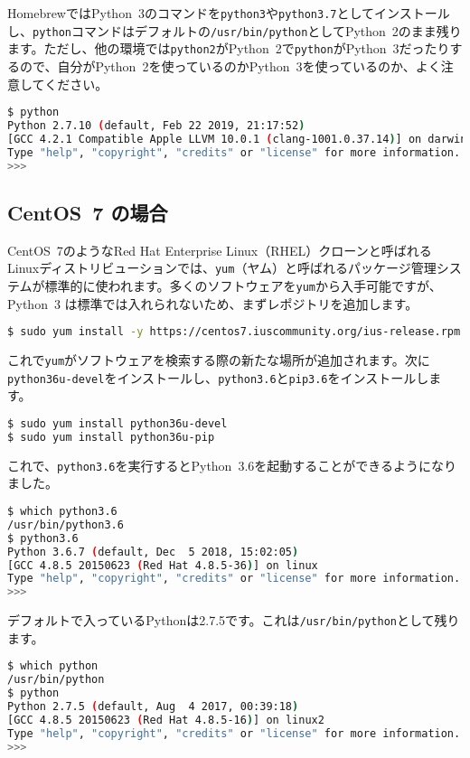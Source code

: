 HomebrewではPython~3のコマンドを\texttt{python3}や\texttt{python3.7}としてインストールし、\texttt{python}コマンドはデフォルトの\texttt{/usr/bin/python}としてPython~2のまま残ります。ただし、他の環境では\texttt{python2}がPython~2で\texttt{python}がPython~3だったりするので、自分がPython~2を使っているのかPython~3を使っているのか、よく注意してください。

\begin{lstlisting}[language=bash]
$ python
Python 2.7.10 (default, Feb 22 2019, 21:17:52) 
[GCC 4.2.1 Compatible Apple LLVM 10.0.1 (clang-1001.0.37.14)] on darwin
Type "help", "copyright", "credits" or "license" for more information.
>>> 
\end{lstlisting}

\subsection{CentOS~7 の場合}

CentOS~7のようなRed Hat Enterprise Linux（RHEL）クローンと呼ばれるLinuxディストリビューションでは、\texttt{yum}（ヤム）と呼ばれるパッケージ管理システムが標準的に使われます。多くのソフトウェアを\texttt{yum}から入手可能ですが、Python~3 は標準では入れられないため、まずレポジトリを追加します。

\begin{lstlisting}[language=bash]
$ sudo yum install -y https://centos7.iuscommunity.org/ius-release.rpm
\end{lstlisting}

これで\texttt{yum}がソフトウェアを検索する際の新たな場所が追加されます。次に\texttt{python36u-devel}をインストールし、\texttt{python3.6}と\texttt{pip3.6}をインストールします。

\begin{lstlisting}[language=bash]
$ sudo yum install python36u-devel
$ sudo yum install python36u-pip
\end{lstlisting}

これで、\texttt{python3.6}を実行するとPython~3.6を起動することができるようになりました。
\begin{lstlisting}[language=bash]
$ which python3.6
/usr/bin/python3.6
$ python3.6
Python 3.6.7 (default, Dec  5 2018, 15:02:05) 
[GCC 4.8.5 20150623 (Red Hat 4.8.5-36)] on linux
Type "help", "copyright", "credits" or "license" for more information.
>>> 
\end{lstlisting}

デフォルトで入っているPythonは2.7.5です。これは\texttt{/usr/bin/python}として残ります。
\begin{lstlisting}[language=bash]
$ which python
/usr/bin/python
$ python
Python 2.7.5 (default, Aug  4 2017, 00:39:18) 
[GCC 4.8.5 20150623 (Red Hat 4.8.5-16)] on linux2
Type "help", "copyright", "credits" or "license" for more information.
>>> 
\end{lstlisting}


